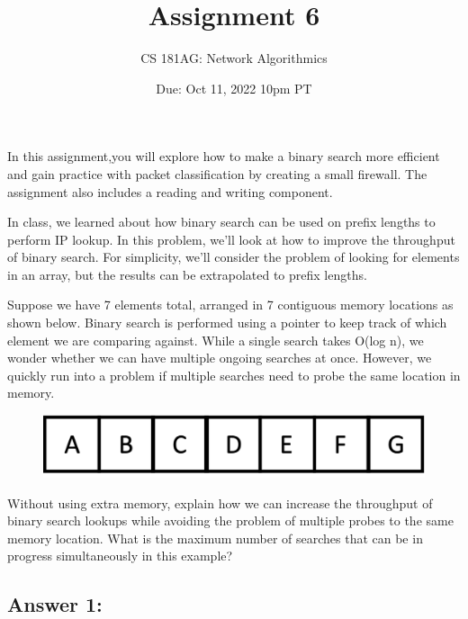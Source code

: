 \documentclass[10pt]{article}
\date{Due: Oct 11, 2022 10pm PT}
\newenvironment{problem}[2][Problem]{\begin{trivlist}
\item[\hskip \labelsep {\bfseries #1}\hskip \labelsep {\bfseries #2.}]}{\end{trivlist}}
\begin{document}
 
\title{Assignment 6}
\author{
CS 181AG: Network Algorithmics}
\maketitle

In this assignment,you will explore how to make a binary search more efficient and gain practice with packet classification by creating a small firewall. The assignment also includes a reading and writing component.

\begin{problem}{1: Improving Binary Search}
In class, we learned about how binary search can be used on prefix lengths to perform IP lookup. In this problem, we'll look at how to improve the throughput of binary search. For simplicity, we'll consider the problem of looking for elements in an array, but the results can be extrapolated to prefix lengths.

Suppose we have 7 elements total, arranged in 7 contiguous memory locations as shown below. Binary search is performed using a pointer to keep track of which element we are comparing against. While a single search takes O(log n), we wonder whether we can have multiple ongoing searches at once. However, we quickly run into a problem if multiple searches need to probe the same location in memory. 

\begin{figure}[h]
    \centering
    \includegraphics[scale=0.2]{figures/bin_search.pdf}
    \label{fig:bin_search}
\end{figure}

Without using extra memory, explain how we can increase the throughput of binary search lookups while avoiding the problem of multiple probes to the same memory location. What is the maximum number of searches that can be in progress simultaneously in this example?
\end{problem}

\subsection*{Answer 1:}
\end{document}
